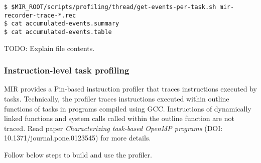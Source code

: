 \documentclass[11pt,a4paper]{article}
\begin{document}
\begin{lstlisting}[style=MyInputStyle]
$ $MIR_ROOT/scripts/profiling/thread/get-events-per-task.sh mir-recorder-trace-*.rec
$ cat accumulated-events.summary
$ cat accumulated-events.table
\end{lstlisting}

TODO: Explain file contents.

\subsubsection{Instruction-level task profiling}\label{instruction-level-task-profiling}

MIR provides a Pin-based instruction profiler that traces instructions executed by tasks. Technically, the profiler traces instructions executed within outline functions of tasks in programs compiled using GCC. Instructions of dynamically linked functions and system calls called within the outline function are not traced. Read paper \textit{Characterizing task-based OpenMP programs} (DOI: 10.1371/journal.pone.0123545) for more details.

Follow below steps to build and use the profiler.
\end{document}
